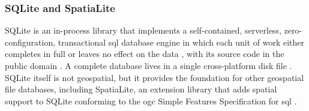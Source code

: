 

\subsubsection{SQLite and SpatiaLite}
\label{background:spatial-data-formats-and-storage-models:file-databases:sqlite-and-spatialite}
SQLite is an in-process library that implements a self-contained, serverless, zero-configuration, transactional \acrfull{sql} database engine in which each unit of work either completes in full or leaves no effect on the data \parencite{sqlite2024_about}, with its source code in the public domain \parencite{sqlite2024_copyright}. A complete database lives in a single cross-platform disk file \parencite{sqlite2024_about}. SQLite itself is not geospatial, but it provides the foundation for other geospatial file databases, including SpatiaLite, an extension library that adds spatial support to SQLite conforming to the \acrshort{ogc} Simple Features Specification for \acrshort{sql} \parencite{gaia2011_spatialite_manual}.


